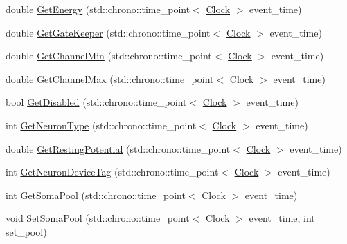 \begin{DoxyCompactItemize}
\item 
double \mbox{\hyperlink{classNeuron_a91dd5325856e246d98c2864e1c955972}{Get\+Energy}} (std\+::chrono\+::time\+\_\+point$<$ \mbox{\hyperlink{universe_8h_a0ef8d951d1ca5ab3cfaf7ab4c7a6fd80}{Clock}} $>$ event\+\_\+time)
\item 
double \mbox{\hyperlink{classNeuron_a94accac3223afdecd1edf25e6db59ace}{Get\+Gate\+Keeper}} (std\+::chrono\+::time\+\_\+point$<$ \mbox{\hyperlink{universe_8h_a0ef8d951d1ca5ab3cfaf7ab4c7a6fd80}{Clock}} $>$ event\+\_\+time)
\item 
double \mbox{\hyperlink{classNeuron_a794c8fa270ea0600dab4fd13c25912fd}{Get\+Channel\+Min}} (std\+::chrono\+::time\+\_\+point$<$ \mbox{\hyperlink{universe_8h_a0ef8d951d1ca5ab3cfaf7ab4c7a6fd80}{Clock}} $>$ event\+\_\+time)
\item 
double \mbox{\hyperlink{classNeuron_ae8b6c47bebe302e62721dc4a6e447ca2}{Get\+Channel\+Max}} (std\+::chrono\+::time\+\_\+point$<$ \mbox{\hyperlink{universe_8h_a0ef8d951d1ca5ab3cfaf7ab4c7a6fd80}{Clock}} $>$ event\+\_\+time)
\item 
bool \mbox{\hyperlink{classNeuron_adfee1a62df820344b84fe2020451b24f}{Get\+Disabled}} (std\+::chrono\+::time\+\_\+point$<$ \mbox{\hyperlink{universe_8h_a0ef8d951d1ca5ab3cfaf7ab4c7a6fd80}{Clock}} $>$ event\+\_\+time)
\item 
int \mbox{\hyperlink{classNeuron_a98f326ea86e6e8371b639609a4495c37}{Get\+Neuron\+Type}} (std\+::chrono\+::time\+\_\+point$<$ \mbox{\hyperlink{universe_8h_a0ef8d951d1ca5ab3cfaf7ab4c7a6fd80}{Clock}} $>$ event\+\_\+time)
\item 
double \mbox{\hyperlink{classNeuron_a0573244d3c78a22a45c249db536cbb68}{Get\+Resting\+Potential}} (std\+::chrono\+::time\+\_\+point$<$ \mbox{\hyperlink{universe_8h_a0ef8d951d1ca5ab3cfaf7ab4c7a6fd80}{Clock}} $>$ event\+\_\+time)
\item 
int \mbox{\hyperlink{classNeuron_aff3a33f5d8ef5dacdec9c03df50f168c}{Get\+Neuron\+Device\+Tag}} (std\+::chrono\+::time\+\_\+point$<$ \mbox{\hyperlink{universe_8h_a0ef8d951d1ca5ab3cfaf7ab4c7a6fd80}{Clock}} $>$ event\+\_\+time)
\item 
int \mbox{\hyperlink{classNeuron_aa6f1237ed89c48eb57610083edf43efa}{Get\+Soma\+Pool}} (std\+::chrono\+::time\+\_\+point$<$ \mbox{\hyperlink{universe_8h_a0ef8d951d1ca5ab3cfaf7ab4c7a6fd80}{Clock}} $>$ event\+\_\+time)
\item 
void \mbox{\hyperlink{classNeuron_ae18e23983d02953fa6886bef0bbeb339}{Set\+Soma\+Pool}} (std\+::chrono\+::time\+\_\+point$<$ \mbox{\hyperlink{universe_8h_a0ef8d951d1ca5ab3cfaf7ab4c7a6fd80}{Clock}} $>$ event\+\_\+time, int set\+\_\+pool)

\end{DoxyCompactItemize}
